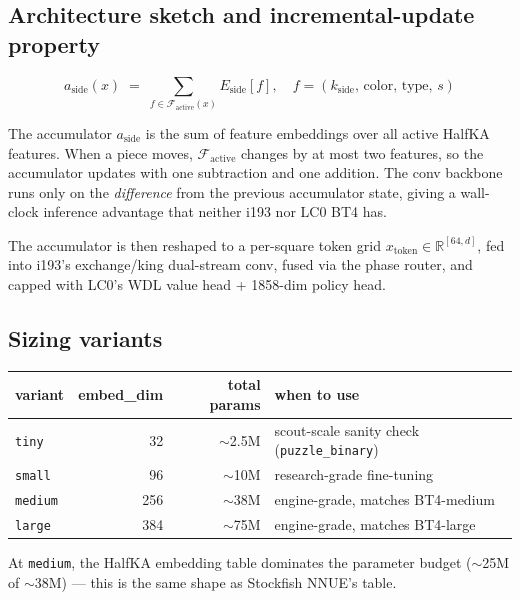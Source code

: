 \documentclass[10pt,a4paper]{article}
\begin{document}
\subsection{Architecture sketch and incremental-update property}

\begin{equation*}
a_{\mathrm{side}}(x) \;=\; \sum_{f \in \mathcal{F}_{\mathrm{active}}(x)} E_{\mathrm{side}}[f],
\quad f = (k_{\mathrm{side}},\, \mathrm{color},\, \mathrm{type},\, s)
\end{equation*}

\noindent
The accumulator $a_{\mathrm{side}}$ is the sum of feature embeddings over
all active HalfKA features.  When a piece moves, $\mathcal{F}_{\mathrm{active}}$
changes by at most two features, so the accumulator updates with one
subtraction and one addition.  The conv backbone runs only on the
\emph{difference} from the previous accumulator state, giving a wall-clock
inference advantage that neither i193 nor LC0 BT4 has.

The accumulator is then reshaped to a per-square token grid
$x_{\mathrm{token}} \in \mathbb{R}^{[64,d]}$, fed into i193's exchange/king
dual-stream conv, fused via the phase router, and capped with LC0's WDL
value head + 1858-dim policy head.

\subsection{Sizing variants}

\begin{footnotesize}
\begin{tabularx}{\linewidth}{@{}L r r L@{}}
\toprule
\textbf{variant} & \textbf{embed\_dim} & \textbf{total params} & \textbf{when to use} \\
\midrule
\texttt{tiny}   & 32  & $\sim$2.5M & scout-scale sanity check (\texttt{puzzle\_binary}) \\
\texttt{small}  & 96  & $\sim$10M  & research-grade fine-tuning \\
\texttt{medium} & 256 & $\sim$38M  & engine-grade, matches BT4-medium \\
\texttt{large}  & 384 & $\sim$75M  & engine-grade, matches BT4-large \\
\bottomrule
\end{tabularx}
\end{footnotesize}

At \texttt{medium}, the HalfKA embedding table dominates the parameter
budget ($\sim$25M of $\sim$38M) --- this is the same shape as Stockfish NNUE's
table.
\end{document}
